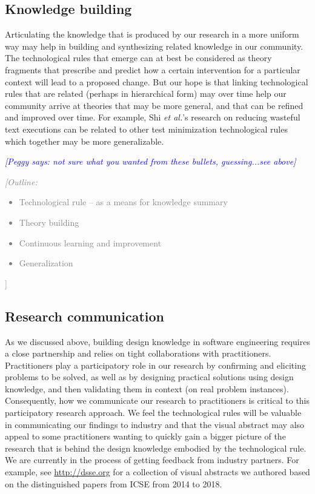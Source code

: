 \documentclass[graybox]{svmult}
\newcommand{\peggy}[1]{\textcolor{blue}{{\it [Peggy says: #1]}}}
\newcommand{\outline}[1]{\textcolor{gray}{{\it [Outline: #1]}}}
\newcommand{\peggy}[1]{}
\newcommand{\outline}[1]{}
\begin{document}
\subsection{Knowledge building}
\label{sec:knowledge}

Articulating the knowledge that is produced by our research in a more uniform way may help in building and synthesizing related knowledge in our community. 
The technological rules that emerge can at best be considered as theory fragments that prescribe and predict how a certain intervention for a particular context will lead to a proposed change. 
But our hope is that linking technological rules that are related (perhaps in hierarchical form) may over time help our community arrive at theories that may be more general, and that can be refined and improved over time. 
For example, Shi \emph{et al.}'s research on reducing wasteful text executions can be related to other test minimization technological rules which together may be more generalizable. 

\peggy{ not sure what you wanted from these bullets, guessing...see above}
\outline{
\begin{itemize}
\item Technological rule -- as a means for knowledge summary
\item Theory building
\item Continuous learning and improvement
\item Generalization
\end{itemize}
}

\subsection{Research communication}
\label{sec:communication}

As we discussed above, building design knowledge in software engineering requires a close partnership and relies on tight collaborations with practitioners. 
Practitioners play a participatory role in our research by confirming and eliciting problems to be solved, as well as by designing practical solutions using design knowledge, and then validating them in context (on real problem instances). 
Consequently, how we communicate our research to practitioners is critical to this participatory research approach. 
We feel the technological rules will be valuable in communicating our findings to industry and that the visual abstract may also appeal to some practitioners wanting to quickly gain a bigger picture of the research that is behind the design knowledge embodied by the technological rule. 
We are currently in the process of getting feedback from industry partners.  For example, see \url{http://dsse.org} for a collection of visual abstracts we authored based on the distinguished papers from ICSE from 2014 to 2018.  
\end{document}
